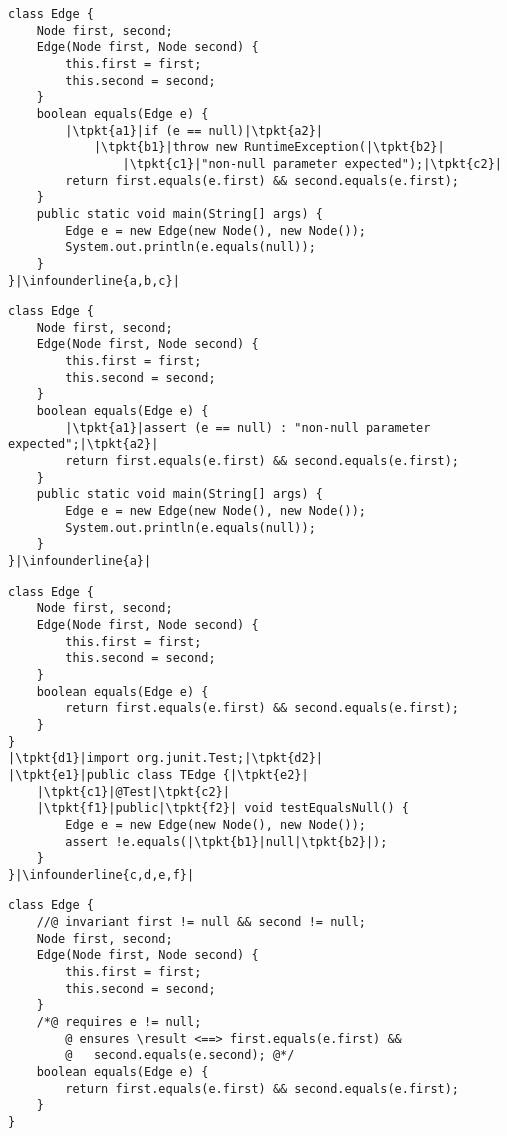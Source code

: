 \begin{lrbox}{}
	\begin{lstlisting}
class Edge {
	Node first, second;
	Edge(Node first, Node second) {
		this.first = first;
		this.second = second;
	}
	boolean equals(Edge e) {
		|\tpkt{a1}|if (e == null)|\tpkt{a2}|
			|\tpkt{b1}|throw new RuntimeException(|\tpkt{b2}|
				|\tpkt{c1}|"non-null parameter expected");|\tpkt{c2}|
		return first.equals(e.first) && second.equals(e.first);
	}
	public static void main(String[] args) {
		Edge e = new Edge(new Node(), new Node());
		System.out.println(e.equals(null));
	}
}|\infounderline{a,b,c}|
	\end{lstlisting}
\end{lrbox}

\newsavebox{\runtimeassertions}
\begin{lrbox}{\runtimeassertions}
	\begin{lstlisting}
class Edge {
	Node first, second;
	Edge(Node first, Node second) {
		this.first = first;
		this.second = second;
	}
	boolean equals(Edge e) {
		|\tpkt{a1}|assert (e == null) : "non-null parameter expected";|\tpkt{a2}|
		return first.equals(e.first) && second.equals(e.first);
	}
	public static void main(String[] args) {
		Edge e = new Edge(new Node(), new Node());
		System.out.println(e.equals(null));
	}
}|\infounderline{a}|
	\end{lstlisting}
\end{lrbox}

\newsavebox{\unittests}
\begin{lrbox}{\unittests}
	\begin{lstlisting}
class Edge {
	Node first, second;
	Edge(Node first, Node second) {
		this.first = first;
		this.second = second;
	}
	boolean equals(Edge e) {
		return first.equals(e.first) && second.equals(e.first);
	}
}
|\tpkt{d1}|import org.junit.Test;|\tpkt{d2}|
|\tpkt{e1}|public class TEdge {|\tpkt{e2}|
	|\tpkt{c1}|@Test|\tpkt{c2}|
	|\tpkt{f1}|public|\tpkt{f2}| void testEqualsNull() {
		Edge e = new Edge(new Node(), new Node());
		assert !e.equals(|\tpkt{b1}|null|\tpkt{b2}|);
	}
}|\infounderline{c,d,e,f}|
	\end{lstlisting}
\end{lrbox}

\newsavebox{\jml}
\begin{lrbox}{\jml}
	\begin{lstlisting}
class Edge {
	//@ invariant first != null && second != null;
	Node first, second;
	Edge(Node first, Node second) {
		this.first = first;
		this.second = second;
	}
	/*@ requires e != null;
		@ ensures \result <==> first.equals(e.first) &&
		@   second.equals(e.second); @*/
	boolean equals(Edge e) {
		return first.equals(e.first) && second.equals(e.first);
	}
}
	\end{lstlisting}
\end{lrbox}

